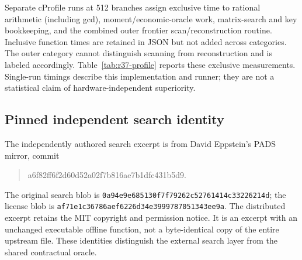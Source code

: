 Separate cProfile runs at 512 branches assign exclusive time to rational arithmetic (including gcd), moment/economic-oracle work, matrix-search and key bookkeeping, and the combined outer frontier scan/reconstruction routine. Inclusive function times are retained in JSON but not added across categories. The outer category cannot distinguish scanning from reconstruction and is labeled accordingly. Table~\ref{tab:r37-profile} reports these exclusive measurements. Single-run timings describe this implementation and runner; they are not a statistical claim of hardware-independent superiority.

\subsection{Pinned independent search identity}
The independently authored search excerpt is from David Eppstein's PADS mirror, commit
\begin{quote}\ttfamily\small a6f82ff6f2d60d52a02f7b816ae7b1dfc431b5d9.\end{quote}
The original search blob is \texttt{0a94e9e685130f7f79262c52761414c33226214d}; the license blob is \texttt{af71e1c36786aef6226d34e3999787051343ee9a}. The distributed excerpt retains the MIT copyright and permission notice. It is an excerpt with an unchanged executable offline function, not a byte-identical copy of the entire upstream file. These identities distinguish the external search layer from the shared contractual oracle.
